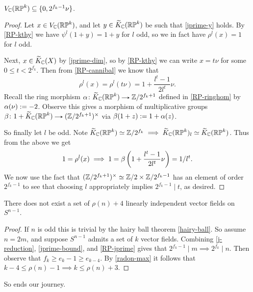 \begin{lemma}
  \label{RP-jprime}
  $V_{\mathbb{C}}(\mathbb{RP}^k) \subseteq \{0,2^{f_k-1}\nu\}$.
\end{lemma}

\begin{proof}
  Let $x \in V_{\mathbb{C}}(\mathbb{RP}^k)$, and let $y \in \widetilde K_{\mathbb{C}}(\mathbb{RP}^k)$ be such
  that \eqref{jprime-y} holds. By \eqref{RP-kthy} we have $\psi^l(1+y) =
  1+y$ for $l$ odd, so we in fact have $\rho^l(x) = 1$ for $l$ odd.

  Next, $x \in \widetilde K_{\mathbb{C}}(X)$ by \eqref{jprime-dim}, so by \eqref{RP-kthy}
  we can write $x = t\nu$ for some $0 \le t < 2^{f_k}$. Then from
  \eqref{RP-cannibal} we know that
  \[
  \rho^l(x) = \rho^l(t\nu) = 1 + \frac{l^t-1}{2l^t}\nu.
  \]
  Recall the ring morphism $\alpha \c \til K_\C(\RP^k) \to
  \Z/2^{f_k+1}$ defined in \eqref{RP-ringhom} by $\alpha(\nu) \mathrel{:=}
  -2$. Observe this gives a morphism of multiplicative groups $\beta
  \c 1 + \til K_\C(\RP^k) \to (\Z/2^{f_k+1})^\times$ via $\beta(1+z)
  \mathrel{:=} 1+\alpha(z)$.

  So finally let $l$ be odd. Note $\widetilde K_{\mathbb{C}}(\mathbb{RP}^k) \simeq \mathbb{Z}/2^{f_k}
  \implies \widetilde K_{\mathbb{C}}(\mathbb{RP}^k)_l \simeq \widetilde K_{\mathbb{C}}(\mathbb{RP}^k)$. Thus from the
  above we get
  \[
  1 = \rho^l(x) \implies 1 = \beta\left(1 + \frac{l^t-1}{2l^t}\nu\right) =
  1/l^t.
  \]
  We now use the fact that $(\mathbb{Z}/2^{f_k+1})^\times \simeq \mathbb{Z}/2 \times
  \mathbb{Z}/2^{f_k-1}$ has an element of order $2^{f_k-1}$ to see that
  choosing $l$ appropriately implies $2^{f_k-1} \mid t$, as desired.
\end{proof}

\begin{theorem}
  \label{complex-upper}
  There does not exist a set of $\rho(n) + 4$ linearly independent
  vector fields on $S^{n-1}$.
\end{theorem}

\begin{proof}
  If $n$ is odd this is trivial by the hairy ball theorem
  \eqref{hairy-ball}. So assume $n = 2m$, and suppose $S^{n-1}$ admits
  a set of $k$ vector fields. Combining \eqref{j-reduction},
  \eqref{jprime-bound}, and \eqref{RP-jprime} gives that $2^{f_k-1} \mid
  m \implies 2^{f_k} \mid n$. Then observe that $f_k \ge e_k - 1 \ge
  e_{k-4}$. By \eqref{radon-max} it follows that $k-4 \le \rho(n) - 1
  \implies k \le \rho(n) + 3$.
\end{proof}

So ends our journey.

